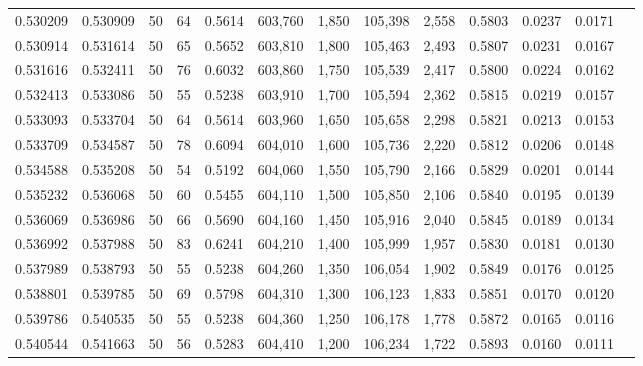 \begin{tabular}{rrrrrrrrrrrrr}
0.530209 & 0.530909 &    50 &  64 &                                     0.5614 & 603,760 &   1,850 & 105,398 &   2,558 & 0.5803 & 0.0237 & 0.0171 \\
0.530914 & 0.531614 &    50 &  65 &                                     0.5652 & 603,810 &   1,800 & 105,463 &   2,493 & 0.5807 & 0.0231 & 0.0167 \\
0.531616 & 0.532411 &    50 &  76 &                                     0.6032 & 603,860 &   1,750 & 105,539 &   2,417 & 0.5800 & 0.0224 & 0.0162 \\
0.532413 & 0.533086 &    50 &  55 &                                     0.5238 & 603,910 &   1,700 & 105,594 &   2,362 & 0.5815 & 0.0219 & 0.0157 \\
0.533093 & 0.533704 &    50 &  64 &                                     0.5614 & 603,960 &   1,650 & 105,658 &   2,298 & 0.5821 & 0.0213 & 0.0153 \\
0.533709 & 0.534587 &    50 &  78 &                                     0.6094 & 604,010 &   1,600 & 105,736 &   2,220 & 0.5812 & 0.0206 & 0.0148 \\
0.534588 & 0.535208 &    50 &  54 &                                     0.5192 & 604,060 &   1,550 & 105,790 &   2,166 & 0.5829 & 0.0201 & 0.0144 \\
0.535232 & 0.536068 &    50 &  60 &                                     0.5455 & 604,110 &   1,500 & 105,850 &   2,106 & 0.5840 & 0.0195 & 0.0139 \\
0.536069 & 0.536986 &    50 &  66 &                                     0.5690 & 604,160 &   1,450 & 105,916 &   2,040 & 0.5845 & 0.0189 & 0.0134 \\
0.536992 & 0.537988 &    50 &  83 &                                     0.6241 & 604,210 &   1,400 & 105,999 &   1,957 & 0.5830 & 0.0181 & 0.0130 \\
0.537989 & 0.538793 &    50 &  55 &                                     0.5238 & 604,260 &   1,350 & 106,054 &   1,902 & 0.5849 & 0.0176 & 0.0125 \\
0.538801 & 0.539785 &    50 &  69 &                                     0.5798 & 604,310 &   1,300 & 106,123 &   1,833 & 0.5851 & 0.0170 & 0.0120 \\
0.539786 & 0.540535 &    50 &  55 &                                     0.5238 & 604,360 &   1,250 & 106,178 &   1,778 & 0.5872 & 0.0165 & 0.0116 \\
0.540544 & 0.541663 &    50 &  56 &                                     0.5283 & 604,410 &   1,200 & 106,234 &   1,722 & 0.5893 & 0.0160 & 0.0111 \\

\end{tabular}
